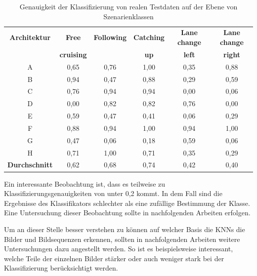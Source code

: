 \begin{table}[h]
\small
\centering
\def\arraystretch{1.4}
\begin{tabular}{c c c c c c}
\textbf{Architektur} & \textbf{Free} & \textbf{Following} & \textbf{Catching} & \textbf{Lane change} & \textbf{Lane change} \\
 & \textbf{cruising} & & \textbf{up} & \textbf{left} & \textbf{right} \\
\hline
A & 0,65 & 0,76 & 1,00 & 0,35 & 0,88 \\
B & 0,94 & 0,47 & 0,88 & 0,29 & 0,59 \\
C & 0,76 & 0,94 & 0,94 & 0,00 & 0,06 \\
D & 0,00 & 0,82 & 0,82 & 0,76 & 0,00 \\
E & 0,59 & 0,47 & 0,41 & 0,06 & 0,29 \\
F & 0,88 & 0,94 & 1,00 & 0,94 & 1,00 \\
G & 0,47 & 0,06 & 0,18 & 0,59 & 0,06 \\
H & 0,71 & 1,00 & 0,71 & 0,35 & 0,29 \\
\hline
\textbf{Durchschnitt} & 0,62 & 0,68 & 0,74 & 0,42 & 0,40 \\
\hline
\end{tabular}
\caption{Genauigkeit der Klassifizierung von realen Testdaten auf der Ebene von Szenarienklassen}
\label{tab_ergebnis_szenarien}
\end{table}

Ein interessante Beobachtung ist, dass es teilweise zu Klassifizierungsgenauigkeiten von unter 0,2 kommt. In dem Fall sind die Ergebnisse des Klassifikators schlechter als eine zufällige Bestimmung der Klasse. Eine Untersuchung dieser Beobachtung sollte in nachfolgenden Arbeiten erfolgen.

Um an dieser Stelle besser verstehen zu können auf welcher Basis die \acp{KNN} die Bilder und Bildsequenzen erkennen, sollten in nachfolgenden Arbeiten weitere Untersuchungen dazu angestellt werden. So ist es beispielsweise interessant, welche Teile der einzelnen Bilder stärker oder auch weniger stark bei der Klassifizierung berücksichtigt werden.








